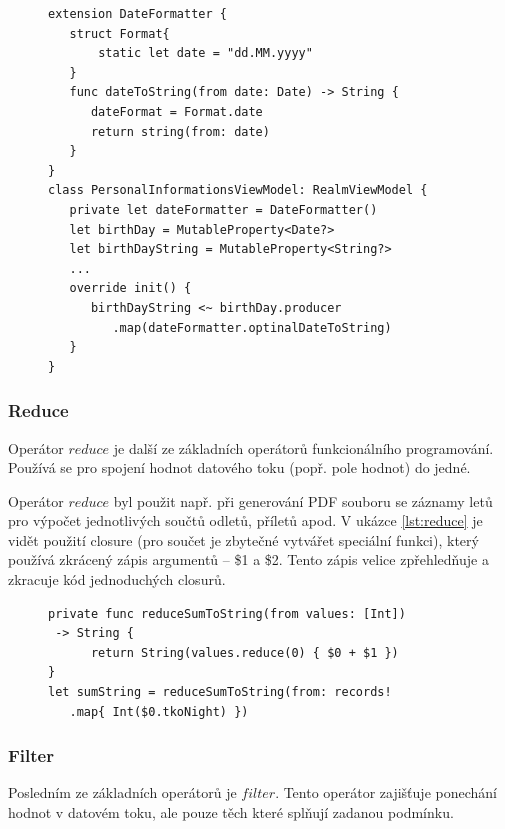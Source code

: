 \documentclass[thesis=M,czech]{FITthesis}[2012/06/26]
\begin{document}
\begin{figure}
\begin{minipage}{\linewidth}
\begin{lstlisting}[caption={Ukázka použití Map},label={lst:map}]
extension DateFormatter {
   struct Format{
       static let date = "dd.MM.yyyy"
   }
   func dateToString(from date: Date) -> String {
      dateFormat = Format.date
      return string(from: date)
   }
}
class PersonalInformationsViewModel: RealmViewModel {
   private let dateFormatter = DateFormatter()
   let birthDay = MutableProperty<Date?>
   let birthDayString = MutableProperty<String?>
   ...
   override init() {
      birthDayString <~ birthDay.producer
         .map(dateFormatter.optinalDateToString)
   }
}
\end{lstlisting}
\end{minipage}
\end{figure}	

\subsubsection{Reduce}
Operátor $reduce$ je další ze základních operátorů funkcionálního programování. Používá se pro spojení hodnot datového toku (popř. pole hodnot) do jedné. \cite{operators}

Operátor $reduce$ byl použit např. při generování PDF souboru se záznamy letů pro výpočet jednotlivých součtů odletů, příletů apod. V ukázce \ref{lst:reduce} je vidět použití closure (pro součet je zbytečné vytvářet speciální funkci), který používá zkrácený zápis argumentů -- \$1 a \$2. Tento zápis velice zpřehledňuje a zkracuje kód jednoduchých closurů.

\begin{figure}
\begin{minipage}{\linewidth}
\begin{lstlisting}[caption={Ukázka použití Reduce},label={lst:reduce}]
private func reduceSumToString(from values: [Int])
 -> String {
      return String(values.reduce(0) { $0 + $1 })
}
let sumString = reduceSumToString(from: records!
   .map{ Int($0.tkoNight) })
\end{lstlisting}
\end{minipage}
\end{figure}

\subsubsection{Filter}
Posledním ze základních operátorů je $filter$. Tento operátor zajišťuje ponechání hodnot v datovém toku, ale pouze těch které splňují zadanou podmínku.\cite{operators}
\end{document}
